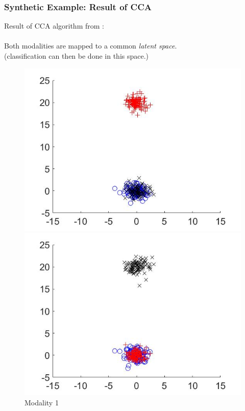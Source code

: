 \documentclass{beamer}
\begin{document}
\begin{frame}
  \frametitle{Synthetic Example: Result of CCA}
  Result of CCA algorithm from \cite{Yeh2014}:\\~\\
  Both modalities are mapped to a common \emph{latent space}.\\
  (classification can then be done in this space.)
  \begin{figure}[ht]
    \begin{minipage}[b]{0.32\linewidth}
      \centering
      \includegraphics[width=\textwidth]{./Images/Synthetic/set1.jpg}
      \caption{Modality 1}
    \end{minipage}
    \begin{minipage}[b]{0.32\linewidth}
      \centering
      \includegraphics[width=\textwidth]{./Images/Synthetic/set2.jpg}

\end{minipage}
\end{figure}
\end{frame}
\end{document}

